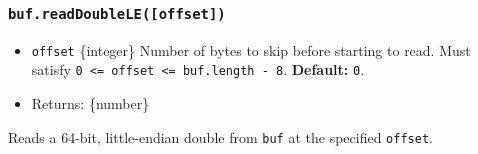 \subsubsection{\texorpdfstring{\texttt{buf.readDoubleLE({[}offset{]})}}{buf.readDoubleLE({[}offset{]})}}\label{buf.readdoubleleoffset}

\begin{itemize}
\tightlist
\item
  \texttt{offset} \{integer\} Number of bytes to skip before starting to
  read. Must satisfy
  \texttt{0\ \textless{}=\ offset\ \textless{}=\ buf.length\ -\ 8}.
  \textbf{Default:} \texttt{0}.
\item
  Returns: \{number\}
\end{itemize}

Reads a 64-bit, little-endian double from \texttt{buf} at the specified
\texttt{offset}.

\begin{Shaded}
\begin{Highlighting}[]
\NormalTok{ \{ }\NormalTok{ \} } \OperatorTok{;}

\OperatorTok{=} \NormalTok{([}\OperatorTok{,} \OperatorTok{,} \OperatorTok{,} \OperatorTok{,} \OperatorTok{,} \OperatorTok{,} \OperatorTok{,} \NormalTok{])}\OperatorTok{;}

\NormalTok{(}\NormalTok{))}\OperatorTok{;}
\NormalTok{(}\NormalTok{))}\OperatorTok{;}
\end{Highlighting}
\end{Shaded}

